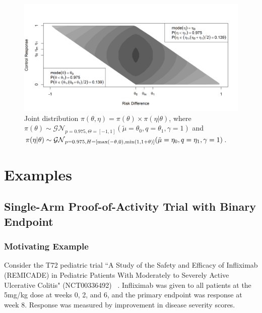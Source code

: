 \documentclass[useAMS,usenatbib,referee]{biom}
\begin{document}
\begin{figure}\begin{center}
\includegraphics[width=6in]{../00-paper/FIGURES/figure5a.png}
\caption{Joint distribution $\pi(\theta,\eta)=\pi(\theta)\times\pi(\eta|\theta)$, where $
\pi(\theta)\sim\mathcal{GN}_{p=0.975,\Theta=[-1,1]}(\tilde{\mu}=\theta_0,q=\theta_1,\gamma=1)$ and $\pi(\eta|\theta)\sim \mathcal{GN}_{p=0.975,H=[{\mathrm{max}}(-\theta,0),{\mathrm{min}}(1,1+\theta)]}(\tilde{\mu}=\eta_0,q=\eta_1,\gamma=1)$.}
\label{fig:figure5}
 \end{center}
\end{figure}
\section{Examples}\label{sec:examples}

\subsection{Single-Arm Proof-of-Activity Trial with Binary Endpoint}\label{sec:example1}
\subsubsection{Motivating Example}
Consider the T72 pediatric trial ``A Study of the Safety and Efficacy of Infliximab (REMICADE) in Pediatric Patients With Moderately to Severely Active Ulcerative Colitis" (NCT00336492) ~\citep{Hyams2012}. Infliximab was given to all patients at the 5mg/kg dose at weeks 0, 2, and 6, and the primary endpoint was response at week 8. Response was measured by improvement in disease severity scores.
\end{document}
